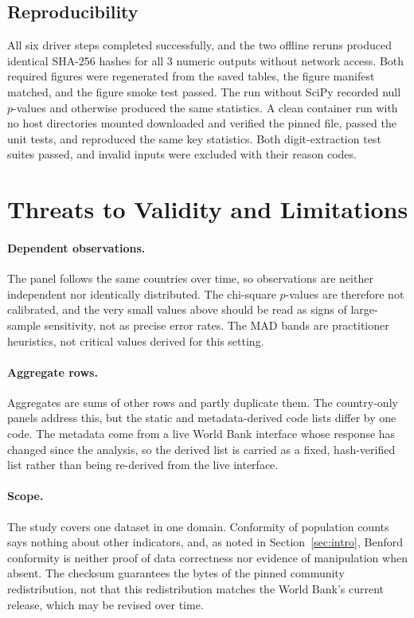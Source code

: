 \documentclass[sigconf,nonacm]{acmart}
\begin{document}
\subsection{Reproducibility}
All six driver steps completed successfully, and the two offline reruns produced identical SHA-256 hashes for all 3 numeric outputs without network access. Both required figures were regenerated from the saved tables, the figure manifest matched, and the figure smoke test passed. The run without SciPy recorded null \(p\)-values and otherwise produced the same statistics. A clean container run with no host directories mounted downloaded and verified the pinned file, passed the unit tests, and reproduced the same key statistics. Both digit-extraction test suites passed, and invalid inputs were excluded with their reason codes.

\section{Threats to Validity and Limitations}
\label{sec:limitations}

\paragraph{Dependent observations.} The panel follows the same countries over time, so observations are neither independent nor identically distributed. The chi-square \(p\)-values are therefore not calibrated, and the very small values above should be read as signs of large-sample sensitivity, not as precise error rates. The MAD bands are practitioner heuristics, not critical values derived for this setting.

\paragraph{Aggregate rows.} Aggregates are sums of other rows and partly duplicate them. The country-only panels address this, but the static and metadata-derived code lists differ by one code. The metadata come from a live World Bank interface whose response has changed since the analysis, so the derived list is carried as a fixed, hash-verified list rather than being re-derived from the live interface.

\paragraph{Scope.} The study covers one dataset in one domain. Conformity of population counts says nothing about other indicators, and, as noted in Section~\ref{sec:intro}, Benford conformity is neither proof of data correctness nor evidence of manipulation when absent. The checksum guarantees the bytes of the pinned community redistribution, not that this redistribution matches the World Bank's current release, which may be revised over time.
\end{document}
